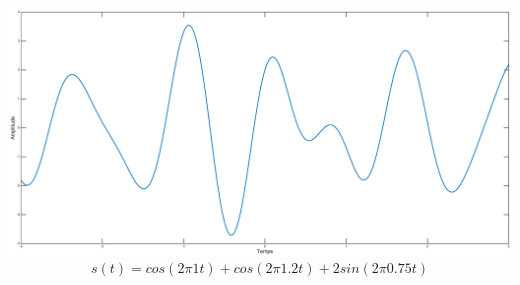 \documentclass[a4paper,11pt]{beamer}
\begin{document}
\begin{frame}
\centering
\includegraphics[scale=.15]{images/GenSinus.eps}
$$
s(t) = cos(2\pi1t) + cos(2\pi1.2t) + 2sin(2\pi0.75t)
$$
\end{frame}
\end{document}
